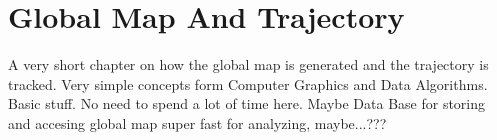 \section{Global Map And Trajectory}
A very short chapter on how the global map is generated and the trajectory is tracked. Very simple concepts form Computer Graphics and Data Algorithms. Basic stuff. No need to spend a lot of time here. Maybe Data Base for storing and accesing global map super fast for analyzing, maybe...???